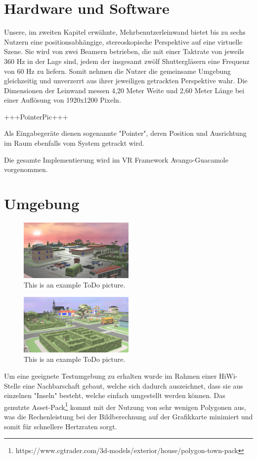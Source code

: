 \section{Hardware und Software}
Unsere, im zweiten Kapitel erwähnte, Mehrbenutzerleinwand bietet bis zu sechs Nutzern eine positionsabhängige, stereoskopische Perspektive auf eine virtuelle Szene. Sie wird von zwei Beamern betrieben, die mit einer Taktrate von jeweils 360 Hz in der Lage sind, jedem der insgesamt zwölf Shuttergläsern eine Frequenz von 60 Hz zu liefern. Somit nehmen die Nutzer die gemeinsame Umgebung gleichzeitig und unverzerrt aus ihrer jeweiligen getrackten Perspektive wahr. Die Dimensionen der Leinwand messen 4,20 Meter Weite und 2,60 Meter Länge bei einer Auflösung von 1920x1200 Pixeln.

+++PointerPic+++

Als Eingabegeräte dienen sogenannte "Pointer", deren Position und Ausrichtung im Raum ebenfalls vom System getrackt wird.

Die gesamte Implementierung wird im VR Framework Avango-Guacamole \cite{Schneegans2014Guacamole-AnShading} vorgenommen.

\section{Umgebung}

\begin{figure}[]
  \centering
  \includegraphics[width=0.5\textwidth]{images/map1.png}
  \caption{This is an example ToDo picture.}
  \label{fig:todo}
\end{figure}


\begin{figure}[]
  \centering
  \includegraphics[width=0.5\textwidth]{images/map2.png}
  \caption{This is an example ToDo picture.}
  \label{fig:todo}
\end{figure}

Um eine geeignete Testumgebung zu erhalten wurde im Rahmen einer HiWi-Stelle eine Nachbarschaft gebaut, welche sich dadurch auszeichnet, dass sie aus einzelnen "Inseln" besteht, welche einfach umgestellt werden können. Das genutzte Asset-Pack\footnote{https://www.cgtrader.com/3d-models/exterior/house/polygon-town-pack} kommt mit der Nutzung von sehr wenigen Polygonen aus, was die Rechenleistung bei der Bildberechnung auf der Grafikkarte minimiert und somit für schnellere Hertzraten sorgt.